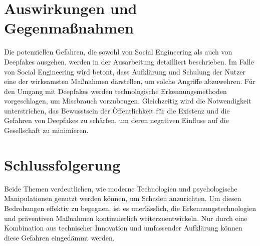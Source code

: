 \section*{Auswirkungen und Gegenmaßnahmen}

Die potenziellen Gefahren, die sowohl von Social Engineering als auch von Deepfakes ausgehen, werden in der Ausarbeitung detailliert beschrieben.
Im Falle von Social Engineering wird betont, dass Aufklärung und Schulung der Nutzer eine der wirksamsten Maßnahmen darstellen, um solche Angriffe abzuwehren.
Für den Umgang mit Deepfakes werden technologische Erkennungsmethoden vorgeschlagen, um Missbrauch vorzubeugen.
Gleichzeitig wird die Notwendigkeit unterstrichen, das Bewusstsein der Öffentlichkeit für die Existenz und die Gefahren von Deepfakes zu schärfen, um deren negativen Einfluss auf die Gesellschaft zu minimieren.

\section*{Schlussfolgerung}

 Beide Themen verdeutlichen, wie moderne Technologien und psychologische Manipulationen genutzt werden können, um Schaden anzurichten.
 Um diesen Bedrohungen effektiv zu begegnen, ist es unerlässlich, die Erkennungstechnologien und präventiven Maßnahmen kontinuierlich weiterzuentwickeln.
 Nur durch eine Kombination aus technischer Innovation und umfassender Aufklärung können diese Gefahren eingedämmt werden.

